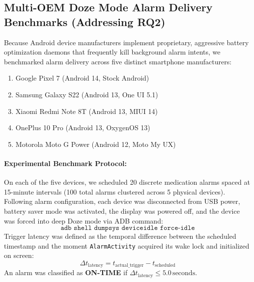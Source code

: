 \documentclass[11pt,a4paper]{article}
\begin{document}
\subsection{Multi-OEM Doze Mode Alarm Delivery Benchmarks (Addressing RQ2)}
\label{sec:oem_benchmarks}

Because Android device manufacturers implement proprietary, aggressive battery optimization daemons that frequently kill background alarm intents, we benchmarked alarm delivery across five distinct smartphone manufacturers:
\begin{enumerate}
    \item Google Pixel 7 (Android 14, Stock Android)
    \item Samsung Galaxy S22 (Android 13, One UI 5.1)
    \item Xiaomi Redmi Note 8T (Android 13, MIUI 14)
    \item OnePlus 10 Pro (Android 13, OxygenOS 13)
    \item Motorola Moto G Power (Android 12, Moto My UX)
\end{enumerate}

\paragraph{Experimental Benchmark Protocol:}
On each of the five devices, we scheduled 20 discrete medication alarms spaced at 15-minute intervals (100 total alarms clustered across 5 physical devices). Following alarm configuration, each device was disconnected from USB power, battery saver mode was activated, the display was powered off, and the device was forced into deep Doze mode via ADB command:
\begin{equation*}
    \texttt{adb shell dumpsys deviceidle force-idle}
\end{equation*}
Trigger latency was defined as the temporal difference between the scheduled timestamp and the moment \texttt{AlarmActivity} acquired its wake lock and initialized on screen:
\begin{equation}
    \Delta t_{\text{latency}} = t_{\text{actual\_trigger}} - t_{\text{scheduled}}
\end{equation}
An alarm was classified as \textbf{ON-TIME} if $\Delta t_{\text{latency}} \le 5.0\,\text{seconds}$.
\end{document}
